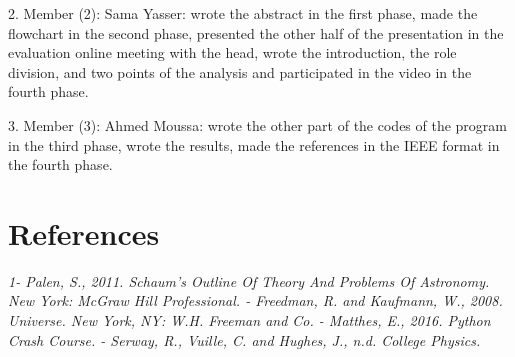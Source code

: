 \documentclass{article}
\begin{document}
2.	Member (2): Sama Yasser: wrote the abstract in the first phase, made the flowchart in the second phase, presented the other half of the presentation in the evaluation online meeting with the head, wrote the introduction, the role division, and two points of the analysis and participated in the video in the fourth phase. 

3.	Member (3): Ahmed Moussa: wrote the other part of the codes of the program in the third phase, wrote the results, made the references in the IEEE format in the fourth phase.

\section{References}
\emph{
1- Palen, S., 2011. Schaum's Outline Of Theory And Problems Of Astronomy. New York: McGraw Hill Professional.
- Freedman, R. and Kaufmann, W., 2008. Universe. New York, NY: W.H. Freeman and Co.
- Matthes, E., 2016. Python Crash Course. 
- Serway, R., Vuille, C. and Hughes, J., n.d. College Physics. }
\end{document}
